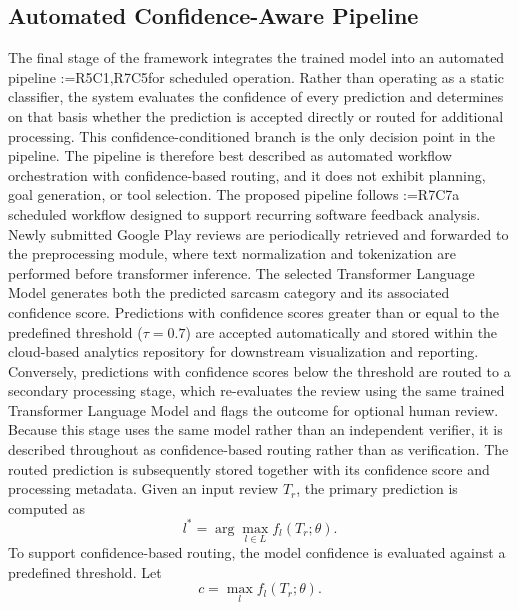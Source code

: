 \documentclass[a4paper,fleqn]{cas-sc}
\makeatletter
\newif\iftracked
\newcommand{\rv@setcolour}[1]{%
  \IfStrEq{#1}{R7C7}{\color{rvEdit}}{%
    \IfSubStr{#1}{R5}{\IfSubStr{#1}{R7}{\color{rvBoth}}{\color{rvFive}}}{\color{rvSeven}}}}
\newcommand{\rv@tag}[1]{\textsuperscript{\sffamily\bfseries\scriptsize[\StrSubstitute{#1}{,}{, }]}\,}
\newcommand{\rv@recordone}[1]{%
  \edef\rv@i{#1}%
  \ifcsdef{rv@n@\rv@i}{}{\csgdef{rv@n@\rv@i}{0}}%
  \csxdef{rv@n@\rv@i}{\the\numexpr\csuse{rv@n@\rv@i}+1\relax}%
  \begingroup\edef\@currentlabel{\rv@i}\label{rv:\rv@i:\csuse{rv@n@\rv@i}}\endgroup}
\newcommand{\rv@record}[1]{\@for\rv@id:=#1\do{\expandafter\rv@recordone\expandafter{\rv@id}}}
\DeclareRobustCommand{\rcrep}[3]{\rv@record{#1}\iftracked{\rv@setcolour{#1}\rv@tag{#1}\rv@strike{#2} #3}\else#3\fi}
\makeatother
\begin{document}
\subsection{Automated Confidence-Aware Pipeline}
\label{sec:pipeline-method}
The final stage of the framework integrates the trained model into an automated pipeline \rcrep{R5C1,R7C5}{capable of continuous operation}{for scheduled operation}. Rather than operating as a static classifier, the system evaluates the confidence of every prediction and determines on that basis whether the prediction is accepted directly or routed for additional processing. This confidence-conditioned branch is the only decision point in the pipeline. The pipeline is therefore best described as automated workflow orchestration with confidence-based routing, and it does not exhibit planning, goal generation, or tool selection. The proposed pipeline follows \rcrep{R7C7}{an event-driven workflow designed to support recurring software feedback analysis..}{a scheduled workflow designed to support recurring software feedback analysis.} Newly submitted Google Play reviews are periodically retrieved and forwarded to the preprocessing module, where text normalization and tokenization are performed before transformer inference. The selected Transformer Language Model generates both the predicted sarcasm category and its associated confidence score. Predictions with confidence scores greater than or equal to the predefined threshold ($\tau = 0.7$) are accepted automatically and stored within the cloud-based analytics repository for downstream visualization and reporting. Conversely, predictions with confidence scores below the threshold are routed to a secondary processing stage, which re-evaluates the review using the same trained Transformer Language Model and flags the outcome for optional human review. Because this stage uses the same model rather than an independent verifier, it is described throughout as confidence-based routing rather than as verification. The routed prediction is subsequently stored together with its confidence score and processing metadata. Given an input review $T_r$, the primary prediction is computed as
\begin{equation}
l^{*} = \arg\max_{l \in L} f_{l}(T_r;\theta).
\label{eq:primary}
\end{equation}
To support confidence-based routing, the model confidence is evaluated against a predefined threshold. Let
\begin{equation}
c = \max_{l} f_{l}(T_r;\theta).
\label{eq:confidence}
\end{equation}
\end{document}
